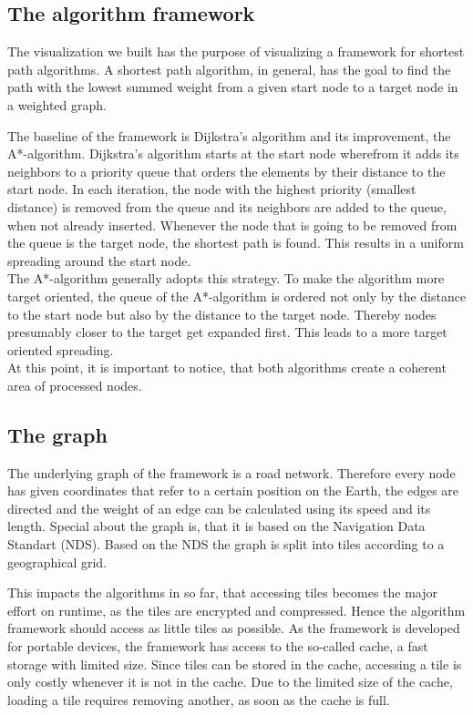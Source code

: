 \documentclass
[
    paper = a4,
    pagesize,
    12 pt,
    oneside,                       %
    open = right,
    DIV = calc,
    BCOR = 0 mm,                   %
    bibtotoc
]
{scrbook}
\begin{document}
\subsection{The algorithm framework}

The visualization we built has the purpose of visualizing a framework for shortest path algorithms.
A shortest path algorithm, in general, has the goal to find the path with the lowest summed weight from a given start node to a target node in a weighted graph.

The baseline of the framework is Dijkstra's algorithm and its improvement, the A*-algorithm.
Dijkstra's algorithm starts at the start node wherefrom it adds its neighbors to a priority queue that orders the elements by their distance to the start node.
In each iteration, the node with the highest priority (smallest distance) is removed from the queue and its neighbors are added to the queue, when not already inserted.
Whenever the node that is going to be removed from the queue is the target node, the shortest path is found.
This results in a uniform spreading around the start node.\\

The A*-algorithm generally adopts this strategy.
To make the algorithm more target oriented, the queue of the A*-algorithm is ordered not only by the distance to the start node but also by the distance to the target node.
Thereby nodes presumably closer to the target get expanded
first.
This leads to a more target oriented spreading.\\

At this point, it is important to notice, that both algorithms create a coherent area of processed nodes.

\subsection{The graph}

The underlying graph of the framework is a road network.
Therefore every node has given coordinates that refer to a certain position on the Earth, the edges are directed and the weight of an edge can be calculated using its speed and its length.
Special about the graph is, that it is based on the Navigation Data Standart (NDS).
Based on the NDS the graph is split into tiles according to a geographical grid.

This impacts the algorithms in so far, that accessing tiles becomes the major effort on runtime, as the tiles are encrypted and compressed.
Hence the algorithm framework should access as little tiles as possible.
As the framework is developed for portable devices, the framework has access to the so-called cache, a fast storage with limited size.
Since tiles can be stored in the cache, accessing a tile is only costly whenever it is not in the cache.
Due to the limited size of the cache, loading a tile requires removing another, as soon as the cache is full.
\end{document}
